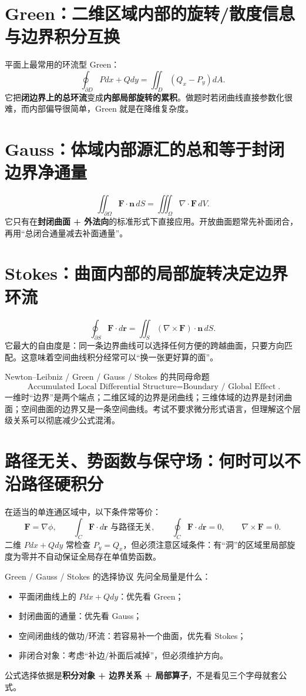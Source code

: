 \documentclass[11pt,a4paper,openany]{ctexbook}
\newcommand{\key}[1]{\textbf{\color{deep}#1}}
\begin{document}
\section{Green：二维区域内部的旋转/散度信息与边界积分互换}
平面上最常用的环流型 Green：
\[
\oint_{\partial D}Pdx+Qdy
=
\iint_D\left(Q_x-P_y\right)dA.
\]
它把\key{闭边界上的总环流}变成\key{内部局部旋转的累积}。做题时若闭曲线直接参数化很难，而内部偏导很简单，Green 就是在降维复杂度。

\section{Gauss：体域内部源汇的总和等于封闭边界净通量}
\[
\iint_{\partial\Omega}\bm F\cdot\bm n\,dS
=
\iiint_\Omega \nabla\cdot\bm F\,dV.
\]
它只有在\key{封闭曲面 + 外法向}的标准形式下直接应用。开放曲面题常先补面闭合，再用“总闭合通量减去补面通量”。

\section{Stokes：曲面内部的局部旋转决定边界环流}
\[
\oint_{\partial S}\bm F\cdot d\bm r
=
\iint_S(\nabla\times\bm F)\cdot\bm n\,dS.
\]
它最大的自由度是：同一条边界曲线可以选择任何方便的跨越曲面，只要方向匹配。这意味着空间曲线积分经常可以“换一张更好算的面”。

\begin{corebox}{Newton--Leibniz / Green / Gauss / Stokes 的共同母命题}
\[
\boxed{\text{Accumulated Local Differential Structure}=\text{Boundary / Global Effect}}.
\]
一维时“边界”是两个端点；二维区域的边界是闭曲线；三维体域的边界是封闭曲面；空间曲面的边界又是一条空间曲线。考试不要求微分形式语言，但理解这个层级关系可以彻底减少公式混淆。
\end{corebox}

\section{路径无关、势函数与保守场：何时可以不沿路径硬积分}
在适当的单连通区域中，以下条件常等价：
\[
\bm F=\nabla\phi,
\qquad
\int_C\bm F\cdot d\bm r\text{ 与路径无关},
\qquad
\oint_C\bm F\cdot d\bm r=0,
\qquad
\nabla\times\bm F=0.
\]
二维 $Pdx+Qdy$ 常检查 $P_y=Q_x$，但必须注意区域条件：有“洞”的区域里局部旋度为零并不自动保证全局存在单值势函数。

\begin{examBox}{Green / Gauss / Stokes 的选择协议}
先问全局量是什么：
\begin{itemize}
  \item 平面闭曲线上的 $Pdx+Qdy$：优先看 Green；
  \item 封闭曲面的通量：优先看 Gauss；
  \item 空间闭曲线的做功/环流：若容易补一个曲面，优先看 Stokes；
  \item 非闭合对象：考虑“补边/补面后减掉”，但必须维护方向。
\end{itemize}
公式选择依据是\key{积分对象 + 边界关系 + 局部算子}，不是看见三个字母就套公式。
\end{examBox}
\end{document}
